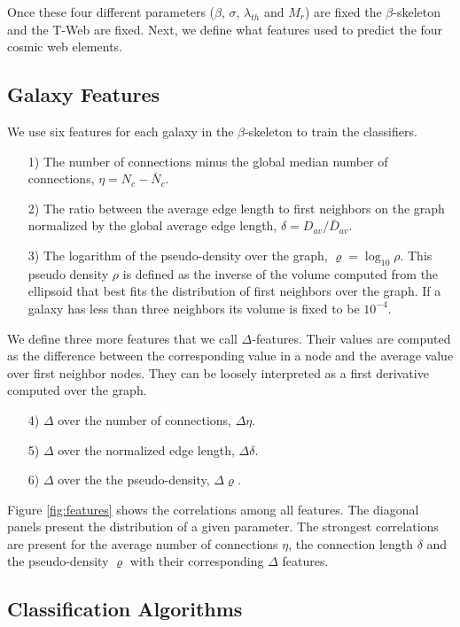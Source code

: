 \documentclass[usenatbib]{mnras}
\begin{document}
Once these four different parameters ($\beta$,
$\sigma$, $\lambda_{th}$ and $M_{r}$) are fixed the $\beta$-skeleton and the
T-Web are fixed.  
Next, we define what features used to predict the four cosmic web elements.

\subsection{Galaxy Features}
We use six features for each galaxy in the $\beta$-skeleton to train the classifiers. 


\begin{enumerate}
\item[1)]
The number of connections minus the global median number of
connections, $\eta = N_c - \bar{N}_c$. 
\item[2)]
The ratio between the average edge length to first neighbors on the graph
normalized by the global average edge length, $\delta=D_{av}/\bar{D}_{av}$. 
\item[3)] 
The logarithm of the pseudo-density over the graph,
  $\varrho=\log_{10}\rho$.   
This pseudo density $\rho$ is defined as the inverse of the volume
computed from the ellipsoid that best fits the distribution of first
neighbors over the graph. 
If a galaxy has less than three neighbors its volume is fixed to be $10^{-4}$.
\end{enumerate}
\noindent
We define three more features that we call $\Delta$-features.
Their values are computed as the difference between the corresponding
value in a node and the average value over first neighbor nodes.  
They can be loosely interpreted as a first derivative computed over the graph. 

\begin{enumerate}
\item[4)] $\Delta$ over the number of connections, $\Delta\eta$.
\item[5)] $\Delta$ over the normalized edge length, $\Delta\delta$.
\item[6)] $\Delta$ over the the pseudo-density, $\Delta\varrho$.
\end{enumerate}

Figure \ref{fig:features} shows the correlations among all features.
The diagonal panels present the distribution of a given parameter.
The strongest correlations are present for the average number of
connections $\eta$, the connection length $\delta$ and the
pseudo-density $\varrho$ with their
corresponding $\Delta$ features.


\subsection{Classification Algorithms}
\end{document}
